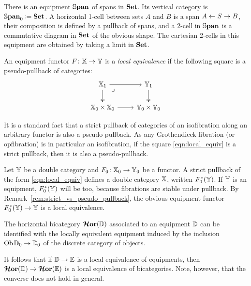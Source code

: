 \documentclass[12pt,oneside,article,draft]{memoir}
\begin{document}
\begin{example}\label{ex:dspan}
   There is an equipment $\mathbb{S}\mathbf{pan}$ of spans in $\mathbf{Set}$. Its vertical category is
   $\mathbb{S}\mathbf{pan}_0\coloneqq\mathbf{Set}$. A horizontal 1-cell between sets $A$ and $B$ is a span $A\leftarrow S\to B$,
   their composition is defined by a pullback of spans, and a 2-cell in $\mathbb{S}\mathbf{pan}$ is a commutative
   diagram in $\mathbf{Set}$ of the obvious shape. The cartesian 2-cells in this equipment are obtained by
   taking a limit in $\mathbf{Set}$.
\end{example}

\begin{definition}\label{def:local_equivalence}
   An equipment functor $F\colon\mathbb{X}\to\mathbb{Y}$ is a \emph{local equivalence} if the following
   square is a pseudo-pullback of categories:
   \begin{equation}\label{eqn:local_equiv}
      \begin{tikzcd}
         \dcat{X}_1 \ar[r] \ar[d,two heads] \ar[dr,phantom,"\lrcorner" very near start]
            & \dcat{Y}_1 \ar[d,two heads] \\
         \dcat{X}_0\times\dcat{X}_0 \ar[r]
            & \dcat{Y}_0\times\dcat{Y}_0
      \end{tikzcd}
   \end{equation}
\end{definition}

\begin{remark}\label{rem:strict_vs_pseudo_pullback}
   It is a standard fact that a strict pullback of categories of an isofibration along an arbitrary
   functor is also a pseudo-pullback. As any Grothendieck fibration (or opfibration) is in
   particular an isofibration, if the square \eqref{eqn:local_equiv} is a strict pullback, then it
   is also a pseudo-pullback.
\end{remark}

\begin{definition}\label{def:induced_locally_equivalent_equipment}
   Let $\mathbb{Y}$ be a double category and $F_0\colon\mathbb{X}_0\to\mathbb{Y}_0$ be a functor. A strict
   pullback of the form \eqref{eqn:local_equiv} defines a double category $\mathbb{X}$, written
   $F_0^*(\mathbb{Y})$. If $\mathbb{Y}$ is an equipment, $F_0^*(\mathbb{Y})$ will be too, because fibrations are
   stable under pullback. By Remark~\ref{rem:strict_vs_pseudo_pullback}, the obvious equipment
   functor $F_0^*(\mathbb{Y})\to\mathbb{Y}$ is a local equivalence.
\end{definition}

\begin{example}\label{ex:horizontal_bicategory}
   The horizontal bicategory $\bm{\mathcal{H}}\mathbf{or}(\mathbb{D})$ associated to an equipment $\mathbb{D}$ can be
   identified with the locally equivalent equipment induced by the inclusion
   $\operatorname{Ob}\mathbb{D}_0\to\mathbb{D}_0$ of the discrete category of objects. 

   It follows that if $\mathbb{D}\to\mathbb{E}$ is a local equivalence of equipments, then
   $\bm{\mathcal{H}}\mathbf{or}(\mathbb{D})\to\bm{\mathcal{H}}\mathbf{or}(\mathbb{E})$ is a local equivalence of bicategories. Note, however, that
   the converse does not hold in general.
\end{example}
\end{document}
